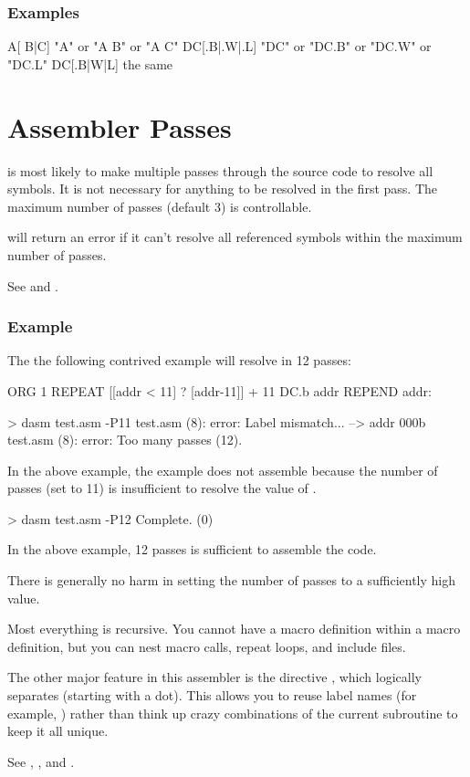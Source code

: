 \subsubsection{Examples}
\begin{code}
A[ {B|C}]       "A" or "A B" or "A C"
DC[{.B|.W|.L}]  "DC" or "DC.B" or "DC.W" or "DC.L"
DC[.{B|W|L}]    the same
\end{code} 
 
\section{Assembler Passes}
 
\dasm is most likely to make multiple passes through the source code to resolve all symbols. It is not necessary for anything to be resolved in the first pass. The maximum number of passes (default 3) is controllable.

\dasm will return an error if it can't resolve all referenced symbols within the maximum number of passes.
 
 See   and .

\subsubsection{Example}
 
 The the following contrived example will resolve in 12 passes:
 
 \begin{code}
   ORG 1
   REPEAT [[addr < 11] ? [addr-11]] + 11
     DC.b addr
   REPEND
 addr:
 \end{code}
 
 \begin{outputx}
 > dasm test.asm -P11
test.asm (8): error: Label mismatch...
 --> addr 000b                  
test.asm (8): error: Too many passes (12).
\end{outputx}
  
In the above example, the example does not assemble because the number of passes (set to 11) is insufficient to resolve the value of .  
    
 \begin{outputx}
 > dasm test.asm -P12
 Complete. (0)
\end{outputx} 
 
 In the above example, 12 passes is sufficient to assemble the code.
 
 There is generally no harm in setting the number of passes to a sufficiently high value.
 
 
 Most everything is recursive.  You cannot have a macro definition
 within a macro definition, but you can nest macro calls, repeat loops,
 and include files.
 
 The other major feature in this assembler is the  directive , which logically separates  (starting with a dot).  This
 allows you to reuse label names (for example, ) rather than
 think up crazy combinations of the current subroutine to keep it all
 unique.
 
 See , , and .
 
 